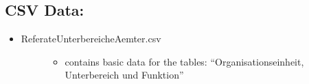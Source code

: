 \documentclass[letterpaper,10pt,english]{sphinxmanual}
\begin{document}
\subsection{CSV Data:}
\label{\detokenize{masterCodeDoc:csv-data}}\begin{itemize}
\item {} \begin{description}
\item[{ReferateUnterbereicheAemter.csv}] \leavevmode\begin{itemize}
\item {} 
contains basic data for the tables: “Organisationseinheit, Unterbereich und Funktion”

\end{itemize}

\end{description}

\end{itemize}
\end{document}
